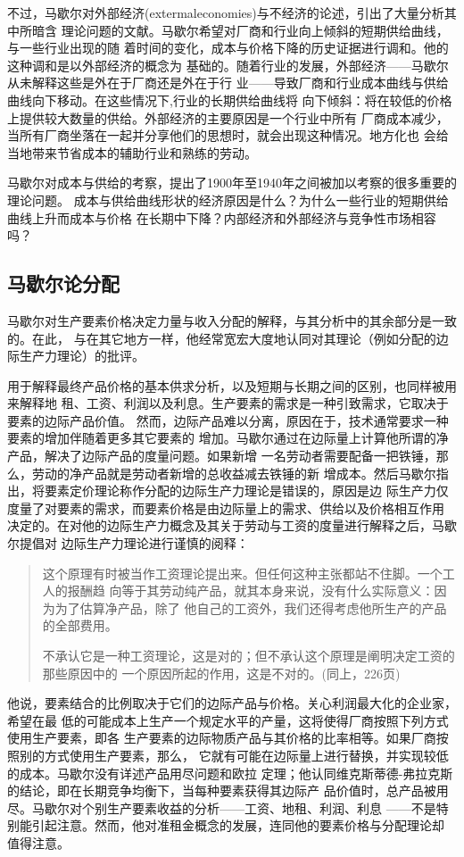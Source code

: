不过，马歇尔对外部经济(extermaleconomies)与不经济的论述，引出了大量分析其中所暗含
理论问题的文献。马歇尔希望对厂商和行业向上倾斜的短期供给曲线，与一些行业出现的随
着时间的变化，成本与价格下降的历史证据进行调和。他的这种调和是以外部经济的概念为
基础的。随着行业的发展，外部经济——马歇尔从未解释这些是外在于厂商还是外在于行
业——导致厂商和行业成本曲线与供给曲线向下移动。在这些情况下,行业的长期供给曲线将
向下倾斜：将在较低的价格上提供较大数量的供给。外部经济的主要原因是一个行业中所有
厂商成本减少，当所有厂商坐落在一起并分享他们的思想时，就会出现这种情况。地方化也
会给当地带来节省成本的辅助行业和熟练的劳动。

马歇尔对成本与供给的考察，提出了1900年至1940年之间被加以考察的很多重要的理论问题。
成本与供给曲线形状的经济原因是什么？为什么一些行业的短期供给曲线上升而成本与价格
在长期中下降？内部经济和外部经济与竞争性市场相容吗？

\subsection{马歇尔论分配}

马歇尔对生产要素价格决定力量与收入分配的解释，与其分析中的其余部分是一致的。在此，
与在其它地方一样，他经常宽宏大度地认同对其理论（例如分配的边际生产力理论）的批评。

用于解释最终产品价格的基本供求分析，以及短期与长期之间的区别，也同样被用来解释地
租、工资、利润以及利息。生产要素的需求是一种引致需求，它取决于要素的边际产品价值。
然而，边际产品难以分离，原因在于，技术通常要求一种要素的增加伴随着更多其它要素的
增加。马歇尔通过在边际量上计算他所谓的净产品，解决了边际产品的度量问题。如果新增
一名劳动者需要配备一把铁锤，那么，劳动的净产品就是劳动者新增的总收益减去铁锤的新
增成本。然后马歇尔指出，将要素定价理论称作分配的边际生产力理论是错误的，原因是边
际生产力仅度量了对要素的需求，而要素价格是由边际量上的需求、供给以及价格相互作用
决定的。在对他的边际生产力概念及其关于劳动与工资的度量进行解释之后，马歇尔提倡对
边际生产力理论进行谨慎的阅释：
\begin{quotation}
  这个原理有时被当作工资理论提出来。但任何这种主张都站不住脚。一个工人的报酬趋
  向等于其劳动纯产品，就其本身来说，没有什么实际意义：因为为了估算净产品，除了
  他自己的工资外，我们还得考虑他所生产的产品的全部费用。

  不承认它是一种工资理论，这是对的；但不承认这个原理是阐明决定工资的那些原因中的
  一个原因所起的作用，这是不对的。(同上，226页)
\end{quotation}

他说，要素结合的比例取决于它们的边际产品与价格。关心利润最大化的企业家，希望在最
低的可能成本上生产一个规定水平的产量，这将使得厂商按照下列方式使用生产要素，即各
生产要素的边际物质产品与其价格的比率相等。如果厂商按照别的方式使用生产要素，那么，
它就有可能在边际量上进行替换，并实现较低的成本。马歇尔没有详述产品用尽问题和欧拉
定理；他认同维克斯蒂德-弗拉克斯的结论，即在长期竞争均衡下，当每种要素获得其边际产
品价值时，总产品被用尽。马歇尔对个别生产要素收益的分析——工资、地租、利润、利息
——不是特别能引起注意。然而，他对准租金概念的发展，连同他的要素价格与分配理论却
值得注意。

